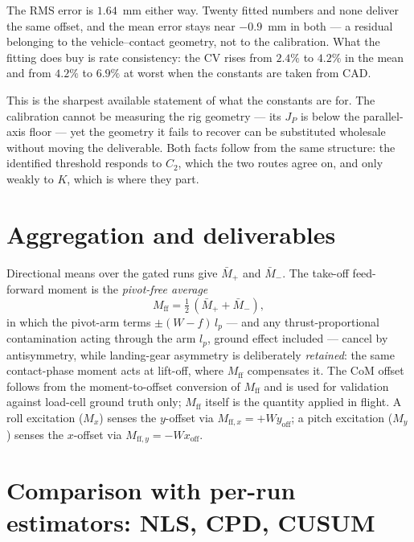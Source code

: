 \documentclass[10pt]{article}
\begin{document}
The RMS error is $1.64$~mm either way. Twenty fitted numbers and none
deliver the same offset, and the mean error stays near $-0.9$~mm in
both --- a residual belonging to the vehicle--contact geometry, not to
the calibration. What the fitting does
buy is rate consistency: the CV rises from $2.4\%$ to $4.2\%$ in the
mean and from $4.2\%$ to $6.9\%$ at worst when the constants are taken
from CAD.

This is the sharpest available statement of what the constants are for.
The calibration cannot be measuring the rig geometry --- its $J_P$ is
below the parallel-axis floor --- yet the geometry it fails to recover
can be substituted wholesale without moving the deliverable. Both facts
follow from the same structure: the identified threshold responds to
$C_2$, which the two routes agree on, and only weakly to $K$, which is
where they part.

\section{Aggregation and deliverables}
\label{sec:aggregation}

Directional means over the gated runs give $\bar M_{+}$ and
$\bar M_{-}$. The take-off feed-forward moment is the \emph{pivot-free
average}
\begin{equation}
M_{\mathrm{ff}} = \tfrac12\,(\bar M_{+} + \bar M_{-}) ,
\label{eq:mff}
\end{equation}
in which the pivot-arm terms $\pm(W - f)\,l_p$ — and any
thrust-proportional contamination acting through the arm $l_p$, ground
effect included — cancel by antisymmetry, while landing-gear asymmetry
is deliberately \emph{retained}: the same contact-phase moment acts at
lift-off, where $M_{\mathrm{ff}}$ compensates it. The CoM offset follows
from the moment-to-offset conversion of $M_{\mathrm{ff}}$ and is used
for validation against load-cell ground truth only; $M_{\mathrm{ff}}$
itself is the quantity applied in flight. A roll excitation ($M_x$)
senses the $y$-offset via $M_{\mathrm{ff},x} = +W y_{\mathrm{off}}$; a
pitch excitation ($M_y$) senses the $x$-offset via
$M_{\mathrm{ff},y} = -W x_{\mathrm{off}}$.

\section{Comparison with per-run estimators: NLS, CPD, CUSUM}
\label{sec:nls}
\end{document}
